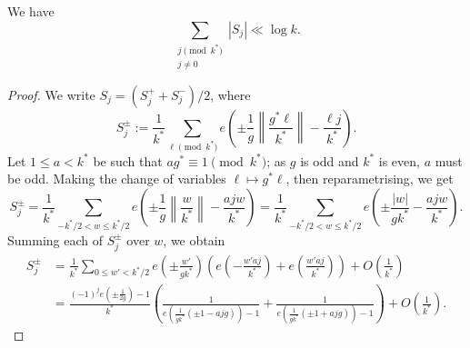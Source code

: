 \documentclass[10pt,a4paper]{amsart}
\renewcommand{\ss}{\substack}
\begin{document}
\begin{lem} \label{lem:SjBds}
We have
$$
\sum_{\ss{j \pmod{k^\ast} \\ j \neq 0}} |S_j| \ll \log k.
$$
\end{lem}

\begin{proof}
We write $S_j = (S_j^+ + S_j^-)/2$, where
$$
S_j^{\pm} := \frac{1}{k^\ast} \sum_{\ell \pmod{k^\ast}} e\left(\pm \frac{1}{g} \left\| \frac{g^\ast\ell}{k^\ast}\right\| - \frac{\ell j}{k^\ast}\right).
$$
Let $1 \leq a < k^\ast$ be such that $ag^\ast \equiv 1 \pmod{k^\ast}$; as $g$ is odd and $k^\ast$ is even, $a$ must be odd. Making the change of variables $\ell \mapsto g^\ast \ell$, then reparametrising, we get 
$$
S_j^{\pm} = \frac{1}{k^\ast} \sum_{-k^\ast/2 < w \leq k^\ast/2} e\left(\pm \frac{1}{g} \left\|\frac{w}{k^\ast}\right\| - \frac{a jw}{k^\ast}\right) = \frac{1}{k^\ast} \sum_{-k^\ast/2 < w \leq k^\ast/2} e\left(\pm \frac{|w|}{gk^\ast} - \frac{a j w}{k^\ast}\right).
$$
Summing each of $S_j^\pm$ over $w$, we obtain
\begin{align*}
S_j^\pm  &= \frac{1}{k^\ast} \sum_{0 \leq w' < k^\ast/2} e\left(\pm \frac{w'}{gk^\ast}\right)\left(e\left(- \frac{w'aj}{k^\ast}\right) + e\left(\frac{w'aj}{k^\ast}\right)\right) + O\left(\frac{1}{k^\ast}\right)\\
&= \frac{(-1)^j e(\pm \tfrac{1}{2g})-1}{k^\ast} \left(\frac{1}{e(\tfrac{1}{gk^\ast}(\pm 1- ajg)) - 1} + \frac{1}{e(\tfrac{1}{gk^\ast}(\pm 1+ ajg)) - 1}\right) + O\left(\frac{1}{k^\ast}\right).

\end{align*}
\end{proof}
\end{document}
